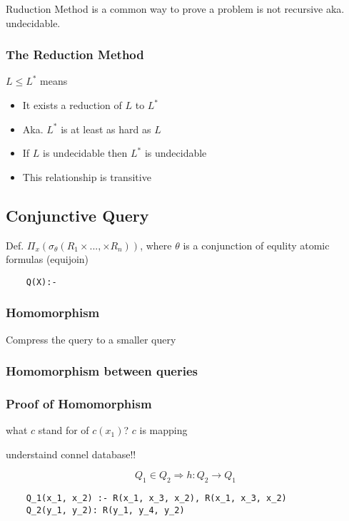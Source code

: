 \documentclass[12pt,a4paper]{article}
\begin{document}
Ruduction Method is a common way to prove a problem is not recursive aka. undecidable.

\subsubsection*{The Reduction Method}

\( L \leq L^* \) means

\begin{itemize}
    \item It exists a reduction of $L$ to $L^*$
    \item Aka. $L^*$ is at least as hard as $L$
    \item If $L$ is undecidable then $L^*$ is undecidable
    \item This relationship is transitive 
\end{itemize}

\subsection*{Conjunctive Query}

Def. \(\Pi_x(\sigma_\theta(R_1\times...,\times R_n))\),
where $\theta$ is a conjunction of equlity atomic formulas (equijoin)

\begin{verbatim}
    Q(X):- 
\end{verbatim}

\subsubsection*{Homomorphism}

Compress the query to a smaller query

\subsubsection*{Homomorphism between queries}



\subsubsection*{Proof of Homomorphism}

what $c$ stand for of $c(x_1)$? $c$ is mapping

understaind connel database!!

\[Q_1 \in Q_2 \Rightarrow h: Q_2 \rightarrow Q_1\]

\begin{verbatim}
    Q_1(x_1, x_2) :- R(x_1, x_3, x_2), R(x_1, x_3, x_2)
    Q_2(y_1, y_2): R(y_1, y_4, y_2)
\end{verbatim}
\end{document}
